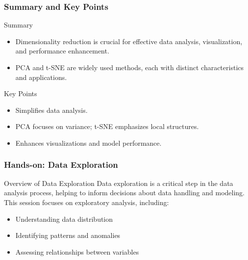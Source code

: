 \documentclass[aspectratio=169]{beamer}
\begin{document}
\begin{frame}[fragile]
    \frametitle{Summary and Key Points}
    \begin{block}{Summary}
        \begin{itemize}
            \item Dimensionality reduction is crucial for effective data analysis, visualization, and performance enhancement.
            \item PCA and t-SNE are widely used methods, each with distinct characteristics and applications.
        \end{itemize}
    \end{block}

    \begin{block}{Key Points}
        \begin{itemize}
            \item Simplifies data analysis.
            \item PCA focuses on variance; t-SNE emphasizes local structures.
            \item Enhances visualizations and model performance.
        \end{itemize}
    \end{block}
\end{frame}

\begin{frame}
    \frametitle{Hands-on: Data Exploration}
    \begin{block}{Overview of Data Exploration}
        Data exploration is a critical step in the data analysis process, helping to inform decisions about data handling and modeling. This session focuses on exploratory analysis, including:
        \begin{itemize}
            \item Understanding data distribution
            \item Identifying patterns and anomalies
            \item Assessing relationships between variables
        \end{itemize}
    \end{block}
\end{frame}
\end{document}
